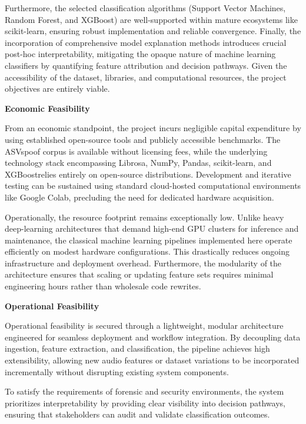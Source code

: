 \documentclass[12pt,a4paper]{report}
\begin{document}
Furthermore, the selected classification algorithms (Support Vector Machines, Random Forest, and XGBoost) are well-supported within mature ecosystems like scikit-learn, ensuring robust implementation and reliable convergence. Finally, the incorporation of comprehensive model explanation methods introduces crucial post-hoc interpretability, mitigating the opaque nature of machine learning classifiers by quantifying feature attribution and decision pathways. Given the accessibility of the dataset, libraries, and computational resources, the project objectives are entirely viable.

\textbf{Economic Feasibility}

From an economic standpoint, the project incurs negligible capital expenditure by using established open-source tools and publicly accessible benchmarks. The ASVspoof corpus is available without licensing fees, while the underlying technology stack encompassing Librosa, NumPy, Pandas, scikit-learn, and XGBoostrelies entirely on open-source distributions. Development and iterative testing can be sustained using standard cloud-hosted computational environments like Google Colab, precluding the need for dedicated hardware acquisition.

Operationally, the resource footprint remains exceptionally low. Unlike heavy deep-learning architectures that demand high-end GPU clusters for inference and maintenance, the classical machine learning pipelines implemented here operate efficiently on modest hardware configurations. This drastically reduces ongoing infrastructure and deployment overhead. Furthermore, the modularity of the architecture ensures that scaling or updating feature sets requires minimal engineering hours rather than wholesale code rewrites. 

\textbf{Operational Feasibility}

Operational feasibility is secured through a lightweight, modular architecture engineered for seamless deployment and workflow integration. By decoupling data ingestion, feature extraction, and classification, the pipeline achieves high extensibility, allowing new audio features or dataset variations to be incorporated incrementally without disrupting existing system components. 

To satisfy the requirements of forensic and security environments, the system prioritizes interpretability by providing clear visibility into decision pathways, ensuring that stakeholders can audit and validate classification outcomes.  
\end{document}
